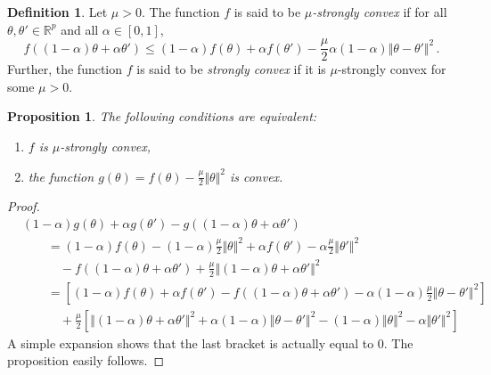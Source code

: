 \documentclass[11pt,reqno]{article}
\newcommand{\R}{\mathbb{R}}
\renewcommand{\leq}{\leqslant}
\numberwithin{equation}{section}
\theoremstyle{plain}
\newtheorem{proposition}[assumption]{Proposition}
\theoremstyle{definition}
\newtheorem{definition}[assumption]{Definition}
\theoremstyle{remark}
\begin{document}
\begin{definition}
	Let $\mu > 0$. The function $f$ is said to be \emph{$\mu$-strongly convex} if for all $\theta, \theta' \in \R^p$ and all $\alpha \in [0,1]$, 
	\begin{equation*}
		f((1-\alpha) \theta + \alpha \theta') \leq (1-\alpha) f(\theta) + \alpha f(\theta') - \frac{\mu}{2} \alpha (1-\alpha) \Vert \theta - \theta' \Vert^2 \, .
	\end{equation*}
	Further, the function $f$ is said to be \emph{strongly convex} if it is $\mu$-strongly convex for some $\mu >0$.
\end{definition}

\begin{proposition}
	\label{prop:strong-convex-gen}
	The following conditions are equivalent:
	\begin{enumerate}[label=(\roman*)]
		\item $f$ is $\mu$-strongly convex,
		\item the function $g(\theta ) = f(\theta) - \frac{\mu}{2}\Vert \theta \Vert^2$ is convex.
	\end{enumerate} 
\end{proposition}

\begin{proof}
	\begin{align*}
		&(1-\alpha) g(\theta) + \alpha g(\theta') -g((1-\alpha) \theta + \alpha \theta') \\
		&\qquad= (1-\alpha) f(\theta) -(1-\alpha) \frac{\mu}{2} \Vert \theta \Vert^2 + \alpha f(\theta') - \alpha \frac{\mu}{2} \Vert \theta' \Vert^2 \\
		&\qquad\quad- f((1-\alpha)\theta + \alpha \theta') + \frac{\mu}{2} \Vert (1-\alpha) \theta + \alpha \theta' \Vert^2 \\
		&\qquad=\left[(1-\alpha) f(\theta) + \alpha f(\theta') - f((1-\alpha)\theta + \alpha \theta') - \alpha(1-\alpha)\frac{\mu}{2} \Vert \theta - \theta' \Vert^2 \right]\\
		&\qquad\quad+ \frac{\mu}{2} \left[\Vert (1-\alpha) \theta + \alpha \theta' \Vert^2 + \alpha(1-\alpha) \Vert \theta - \theta' \Vert^2 - (1-\alpha) \Vert \theta \Vert^2- \alpha  \Vert \theta' \Vert^2\right]
	\end{align*}
	A simple expansion shows that the last bracket is actually equal to $0$. The proposition easily follows.
\end{proof}
\end{document}
